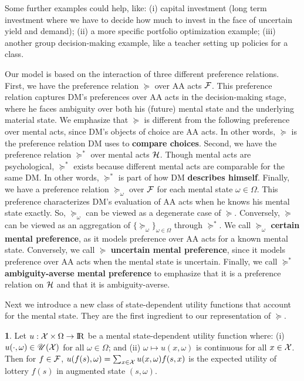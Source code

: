 \documentclass[11pt,oneside]{article}
\theoremstyle{plain}
\theoremstyle{plain}
\theoremstyle{plain}
\theoremstyle{plain}
\theoremstyle{plain}
\theoremstyle{definition}
\newtheorem{defn}[thm]{\protect\definitionname}
\theoremstyle{definition}
\theoremstyle{remark}
\theoremstyle{plain}
\providecommand{\definitionname}{Definition}
\newcommand{\R}{{\rm I\!R}}
\newcommand{\F}{{\cal F}}
\newcommand{\pfo}{\pf_\omega}
\newcommand{\pf}{\succeq}
\newcommand{\pfs}{\succeq^*}
\newcommand{\wh}[1]{{\color{blue} #1     }}
\begin{document}
\wh{Some further examples could help, like: (i) capital investment (long term investment where we have to decide how much to invest in the face of uncertain yield and demand); (ii) a more specific portfolio optimization example; (iii) another group decision-making example, like a teacher setting up policies for a class.} 

Our model is based on the interaction of three different preference relations. First, we have the preference relation $\pf$ over AA acts $\F$. This preference relation captures DM's preferences over AA acts in the decision-making stage, where he faces ambiguity over both his (future) mental state and the underlying material state.
We emphasize that $\pf$ is different from the following preference over mental acts, since DM's objects of choice are AA acts.
In other words, $\pf$ is the preference relation DM uses to \textbf{compare choices}.
Second, we have the preference relation $\pfs$ over mental acts ${\cal H}$.
Though mental acts are psychological, $\pfs$ exists because different mental acts are comparable for the same DM. In other words, $\pfs$ is part of how DM \textbf{describes himself}. Finally, we have a preference relation $\pf_\omega$ over $\F$ for each mental state $\omega \in \Omega$. This preference characterizes DM's evaluation of AA acts when he knows his mental state exactly. So, $\pf_\omega$ can be viewed as a degenerate case of $\pf$.
Conversely, $\pf$ can be viewed as an aggregation of $\{\pf_\omega\}_{\omega \in \Omega}$ through $\pfs$. We call $\pfo$ \textbf{certain mental preference}, as it models preference over AA acts for a known mental state.
Conversely, we call $\pf$ \textbf{uncertain mental preference}, since it models preference over AA acts when the mental state is uncertain. Finally, we call $\pfs$ \textbf{ambiguity-averse mental preference} to emphasize that it is a preference relation on ${\cal H}$ and that it is ambiguity-averse.

Next we introduce a new class of state-dependent utility functions that account for the mental state. They are the first ingredient to our representation of $\pf$.

\begin{defn}
\label{defn:state_utility function}
Let $u : {\cal X} \times \Omega \rightarrow \R$ be a mental state-dependent utility function where: (i) $u(\cdot, \omega) \in \mathscr{U}({\cal X})$ for all $\omega \in \Omega$; and (ii) $\omega \mapsto u(x,\omega)$ is continuous for all $x \in {\cal X}$.
Then for $f \in \F$, $u(f(s), \omega) = \sum_{x \in {\cal X}} u(x, \omega) f(s, x)$ is the expected utility of lottery $f(s)$ in augmented state $(s, \omega)$.
\end{defn}
\end{document}
